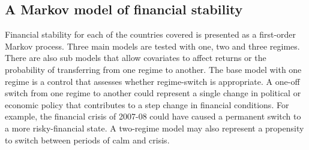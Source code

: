 \documentclass[12pt, a4paper, oneside]{article} %
\begin{document}


\subsection{A Markov model of financial stability}
Financial stability for each of the countries covered is presented as a first-order Markov process.  Three main models are tested with one, two and three regimes.  There are also sub models that allow covariates to affect returns or the probability of transferring from one regime to another. The base model with one regime is a control that assesses whether regime-switch is appropriate.  A one-off switch from one regime to another could represent a single change in political or economic policy that contributes to a step change in financial conditions.  For example, the financial crisis of 2007-08 could have caused a permanent switch to a more risky-financial state.  A two-regime model may also represent a propensity to switch between periods of calm and crisis.  
\end{document}
